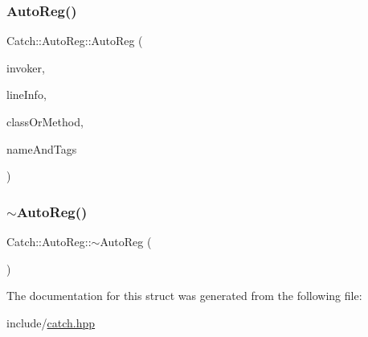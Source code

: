 \subsubsection{\texorpdfstring{AutoReg()}{AutoReg()}}
{\footnotesize\ttfamily Catch\+::\+Auto\+Reg\+::\+Auto\+Reg (\begin{DoxyParamCaption}\item[{\mbox{\hyperlink{struct_catch_1_1_i_test_invoker}{I\+Test\+Invoker}} $\ast$}]{invoker,  }\item[{\mbox{\hyperlink{struct_catch_1_1_source_line_info}{Source\+Line\+Info}} const \&}]{line\+Info,  }\item[{\mbox{\hyperlink{class_catch_1_1_string_ref}{String\+Ref}} const \&}]{class\+Or\+Method,  }\item[{\mbox{\hyperlink{struct_catch_1_1_name_and_tags}{Name\+And\+Tags}} const \&}]{name\+And\+Tags }\end{DoxyParamCaption})\hspace{0.3cm}{\ttfamily [noexcept]}}

\mbox{\label{struct_catch_1_1_auto_reg_a3cdb53f1e5ff115310f3372bebe198f1}} 
\subsubsection{\texorpdfstring{$\sim$AutoReg()}{~AutoReg()}}
{\footnotesize\ttfamily Catch\+::\+Auto\+Reg\+::$\sim$\+Auto\+Reg (\begin{DoxyParamCaption}{ }\end{DoxyParamCaption})}



The documentation for this struct was generated from the following file\+:\begin{DoxyCompactItemize}
\item 
include/\mbox{\hyperlink{catch_8hpp}{catch.\+hpp}}\end{DoxyCompactItemize}

